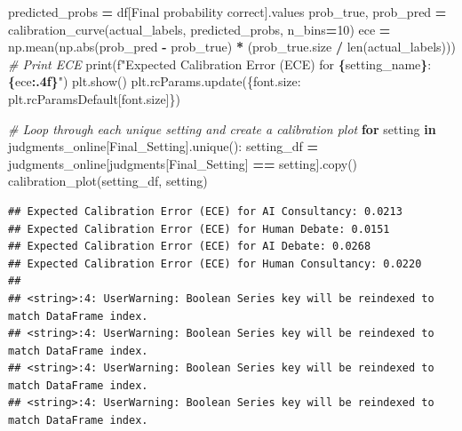 \documentclass[
]{article}
\newenvironment{Shaded}{\begin{snugshade}}{\end{snugshade}}
\newcommand{\BuiltInTok}[1]{#1}
\newcommand{\CommentTok}[1]{\textcolor[rgb]{0.56,0.35,0.01}{\textit{#1}}}
\newcommand{\ControlFlowTok}[1]{\textcolor[rgb]{0.13,0.29,0.53}{\textbf{#1}}}
\newcommand{\DecValTok}[1]{\textcolor[rgb]{0.00,0.00,0.81}{#1}}
\newcommand{\KeywordTok}[1]{\textcolor[rgb]{0.13,0.29,0.53}{\textbf{#1}}}
\newcommand{\NormalTok}[1]{#1}
\newcommand{\OperatorTok}[1]{\textcolor[rgb]{0.81,0.36,0.00}{\textbf{#1}}}
\newcommand{\SpecialCharTok}[1]{\textcolor[rgb]{0.81,0.36,0.00}{\textbf{#1}}}
\newcommand{\SpecialStringTok}[1]{\textcolor[rgb]{0.31,0.60,0.02}{#1}}
\newcommand{\StringTok}[1]{\textcolor[rgb]{0.31,0.60,0.02}{#1}}
\begin{document}
\begin{Shaded}
\begin{Highlighting}[]
\NormalTok{    predicted\_probs }\OperatorTok{=}\NormalTok{ df[}\StringTok{\textquotesingle{}Final probability correct\textquotesingle{}}\NormalTok{].values}
\NormalTok{    prob\_true, prob\_pred }\OperatorTok{=}\NormalTok{ calibration\_curve(actual\_labels, predicted\_probs, n\_bins}\OperatorTok{=}\DecValTok{10}\NormalTok{)}
\NormalTok{    ece }\OperatorTok{=}\NormalTok{ np.mean(np.}\BuiltInTok{abs}\NormalTok{(prob\_pred }\OperatorTok{{-}}\NormalTok{ prob\_true) }\OperatorTok{*}\NormalTok{ (prob\_true.size }\OperatorTok{/} \BuiltInTok{len}\NormalTok{(actual\_labels)))}
    \CommentTok{\# Print ECE}
    \BuiltInTok{print}\NormalTok{(}\SpecialStringTok{f"Expected Calibration Error (ECE) for }\SpecialCharTok{\{}\NormalTok{setting\_name}\SpecialCharTok{\}}\SpecialStringTok{: }\SpecialCharTok{\{}\NormalTok{ece}\SpecialCharTok{:.4f\}}\SpecialStringTok{"}\NormalTok{)}
\NormalTok{    plt.show()}
\NormalTok{    plt.rcParams.update(\{}\StringTok{\textquotesingle{}font.size\textquotesingle{}}\NormalTok{: plt.rcParamsDefault[}\StringTok{\textquotesingle{}font.size\textquotesingle{}}\NormalTok{]\})}

\CommentTok{\# Loop through each unique setting and create a calibration plot}
\ControlFlowTok{for}\NormalTok{ setting }\KeywordTok{in}\NormalTok{ judgments\_online[}\StringTok{\textquotesingle{}Final\_Setting\textquotesingle{}}\NormalTok{].unique():}
\NormalTok{    setting\_df }\OperatorTok{=}\NormalTok{ judgments\_online[judgments[}\StringTok{\textquotesingle{}Final\_Setting\textquotesingle{}}\NormalTok{] }\OperatorTok{==}\NormalTok{ setting].copy()}
\NormalTok{    calibration\_plot(setting\_df, setting)}
\end{Highlighting}
\end{Shaded}

\begin{verbatim}
## Expected Calibration Error (ECE) for AI Consultancy: 0.0213
## Expected Calibration Error (ECE) for Human Debate: 0.0151
## Expected Calibration Error (ECE) for AI Debate: 0.0268
## Expected Calibration Error (ECE) for Human Consultancy: 0.0220
## 
## <string>:4: UserWarning: Boolean Series key will be reindexed to match DataFrame index.
## <string>:4: UserWarning: Boolean Series key will be reindexed to match DataFrame index.
## <string>:4: UserWarning: Boolean Series key will be reindexed to match DataFrame index.
## <string>:4: UserWarning: Boolean Series key will be reindexed to match DataFrame index.
\end{verbatim}
\end{document}
